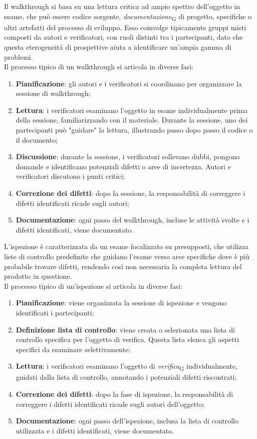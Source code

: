 Il walkthrough si basa su una lettura critica ad ampio spettro dell'oggetto in esame, che può essere codice sorgente, \textit{documentazione}\textsubscript{G} di progetto, specifiche o altri artefatti del processo di sviluppo. Esso coinvolge tipicamente gruppi misti composti da autori e verificatori, con ruoli distinti tra i partecipanti, dato che questa eterogeneità di prospettive aiuta a identificare un'ampia gamma di problemi. \\
Il processo tipico di un walkthrough si articola in diverse fasi:
\begin{enumerate}
    \item \textbf{Pianificazione}: gli autori e i verificatori si coordinano per organizzare la sessione di walkthrough;
    \item \textbf{Lettura}: i verificatori esaminano l'oggetto in esame individualmente prima della sessione, familiarizzando con il materiale. Durante la sessione, uno dei partecipanti può "guidare" la lettura, illustrando passo dopo passo il codice o il documento;
    \item \textbf{Discussione}: durante la sessione, i verificatori sollevano dubbi, pongono domande e identificano potenziali difetti o aree di incertezza. Autori e verificatori discutono i punti critici;
    \item \textbf{Correzione dei difetti}: dopo la sessione, la responsabilità di correggere i difetti identificati ricade sugli autori;
    \item \textbf{Documentazione}: ogni passo del walkthrough, incluse le attività svolte e i difetti identificati, viene documentato.
\end{enumerate}

L'ispezione è caratterizzata da un esame focalizzato su presupposti, che utilizza liste di controllo predefinite che guidano l'esame verso aree specifiche dove è più probabile trovare difetti, rendendo così non necessaria la completa lettura del prodotto in questione. \\
Il processo tipico di un'ispezione si articola in diverse fasi:
\begin{enumerate}
    \item \textbf{Pianificazione}: viene organizzata la sessione di ispezione e vengono identificati i partecipanti;
    \item \textbf{Definizione lista di controllo}: viene creata o selezionata una lista di controllo specifica per l'oggetto di verifica. Questa lista elenca gli aspetti specifici da esaminare selettivamente;
    \item \textbf{Lettura}: i verificatori esaminano l'oggetto di \textit{verifica}\textsubscript{G} individualmente, guidati dalla lista di controllo, annotando i potenziali difetti riscontrati;
    \item \textbf{Correzione dei difetti}: dopo la fase di ispezione, la responsabilità di correggere i difetti identificati ricade sugli autori dell'oggetto;
    \item \textbf{Documentazione}: ogni passo dell'ispezione, inclusa la lista di controllo utilizzata e i difetti identificati, viene documentato.
\end{enumerate}

